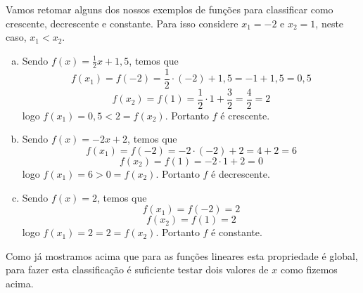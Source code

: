  \begin{exem}
 Vamos retomar alguns dos nossos exemplos de funções para classificar como crescente, decrescente e constante. Para isso considere $x_1= -2$ e $x_2= 1$, neste caso, $x_1 < x_2$.
  \begin{enumerate}[a)]
   \item Sendo $f(x)= \frac{1}{2}x + 1,5$, temos que
\begin{equation*}
f(x_1)= f(-2)= \frac{1}{2}\cdot (-2) + 1,5= -1 + 1,5= 0,5
\end{equation*}
\begin{equation*}
f(x_2)= f(1)= \frac{1}{2} \cdot 1+\frac{3}{2}= \frac{4}{2}= 2
\end{equation*}
   logo $f(x_1)= 0,5 < 2= f(x_2)$. Portanto $f$ é crescente.
   \item Sendo $f(x)= -2x + 2$, temos que
\begin{equation*}
f(x_1)= f(-2)= -2 \cdot (-2) + 2= 4 + 2= 6
\end{equation*}
\begin{equation*}
f(x_2)= f(1)= -2 \cdot 1 + 2= 0
\end{equation*}
   logo $f(x_1)= 6 > 0 = f(x_2)$. Portanto $f$ é decrescente.
   \item Sendo $f(x)= 2$, temos que
\begin{equation*}
f(x_1)= f(-2)= 2
\end{equation*}
\begin{equation*}
f(x_2)= f(1)= 2
\end{equation*}
   logo $f(x_1)= 2 = 2= f(x_2)$. Portanto $f$ é constante.
  \end{enumerate}
  Como já mostramos acima que para as funções lineares esta propriedade é global, para fazer esta classificação é suficiente testar dois valores de $x$ como fizemos acima.

 \end{exem}

